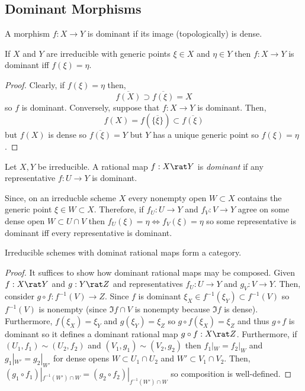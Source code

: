 \documentclass[12pt]{article}
\begin{document}
\subsection{Dominant Morphisms}

\begin{definition}
A morphism $f : X \to Y$ is dominant if its image (topologically) is dense.
\end{definition}


\begin{lemma}
If $X$ and $Y$ are irreducible with generic points $\xi \in X$ and $\eta \in Y$ then $f : X \to Y$ is dominant iff $f(\xi) = \eta$. 
\end{lemma}

\begin{proof}
Clearly, if $f(\xi) = \eta$ then,
\[ \overline{f(X)} \supset \overline{f(\xi)} = X \]
so $f$ is dominant. Conversely, suppose that $f : X \to Y$ is dominant. Then,
\[ f(X) = f(\overline{\{ \xi \}}) \subset \overline{f(\xi)} \]
but $f(X)$ is dense so $\overline{f(\xi)} = Y$ but $Y$ has a unique generic point so $f(\xi) = \eta$.
\end{proof}

\begin{definition}
Let $X, Y$ be irreducible. A rational map $f : X \rat Y$ is \textit{dominant} if any representative $f : U \to Y$ is dominant.
\end{definition}

\begin{rmk}
Since, on an irreducble scheme $X$ every nonempty open $W \subset X$ contains the generic point $\xi \in W \subset X$. Therefore, if $f_U : U \to Y$ and $f_V : V \to Y$ agree on some dense open $W \subset U \cap V$ then $f_U(\xi) = \eta \iff f_V(\xi) = \eta$ so some representative is dominant iff every representative is dominant. 
\end{rmk}

\begin{prop}
Irreducible schemes with dominat rational maps form a category. 
\end{prop}

\begin{proof}
It suffices to show how dominant rational maps may be composed. Given $f : X \rat Y$ and $g : Y \rat Z$ and representatives $f_U : U \to Y$ and $g_V : V \to Y$. Then, consider $g \circ f : f^{-1}(V) \to Z$. Since $f$ is dominant $\xi_X \in f^{-1}(\xi_Y) \subset f^{-1}(V)$ so $f^{-1}(V)$ is nonempty (since $\Im{f} \cap V$ is nonempty because $\Im{f}$ is dense). Furthermore, $f(\xi_X) = \xi_Y$ and $g(\xi_Y) = \xi_Z$ so $g \circ f(\xi_X) = \xi_Z$ and thus $g \circ f$ is dominant so it defines a dominant rational map $g \circ f : X \rat Z$. Furthermore, if $(U_1, f_1) \sim (U_2, f_2)$ and $(V_1, g_1) \sim (V_2, g_2)$ then $f_1 |_W = f_2 |_W$ and $g_1 |_{W'} = g_2 |_{W'}$ for dense opens $W \subset U_1 \cap U_2$ and $W' \subset V_1 \cap V_2$. Then, $(g_1 \circ f_1) |_{f^{-1}(W') \cap W} = (g_2 \circ f_2) |_{f^{-1}(W') \cap W}$ so composition is well-defined. 
\end{proof}
\end{document}
